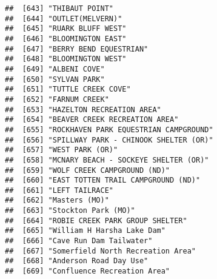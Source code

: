 \documentclass[
]{article}
\begin{document}
\begin{verbatim}
##  [643] "THIBAUT POINT"                                                                       
##  [644] "OUTLET(MELVERN)"                                                                     
##  [645] "RUARK BLUFF WEST"                                                                    
##  [646] "BLOOMINGTON EAST"                                                                    
##  [647] "BERRY BEND EQUESTRIAN"                                                               
##  [648] "BLOOMINGTON WEST"                                                                    
##  [649] "ALBENI COVE"                                                                         
##  [650] "SYLVAN PARK"                                                                         
##  [651] "TUTTLE CREEK COVE"                                                                   
##  [652] "FARNUM CREEK"                                                                        
##  [653] "HAZELTON RECREATION AREA"                                                            
##  [654] "BEAVER CREEK RECREATION AREA"                                                        
##  [655] "ROCKHAVEN PARK EQUESTRIAN CAMPGROUND"                                                
##  [656] "SPILLWAY PARK - CHINOOK SHELTER (OR)"                                                
##  [657] "WEST PARK (OR)"                                                                      
##  [658] "MCNARY BEACH - SOCKEYE SHELTER (OR)"                                                 
##  [659] "WOLF CREEK CAMPGROUND (ND)"                                                          
##  [660] "EAST TOTTEN TRAIL CAMPGROUND (ND)"                                                   
##  [661] "LEFT TAILRACE"                                                                       
##  [662] "Masters (MO)"                                                                        
##  [663] "Stockton Park (MO)"                                                                  
##  [664] "ROBIE CREEK PARK GROUP SHELTER"                                                      
##  [665] "William H Harsha Lake Dam"                                                           
##  [666] "Cave Run Dam Tailwater"                                                              
##  [667] "Somerfield North Recreation Area"                                                    
##  [668] "Anderson Road Day Use"                                                               
##  [669] "Confluence Recreation Area"                                                          

\end{verbatim}
\end{document}
